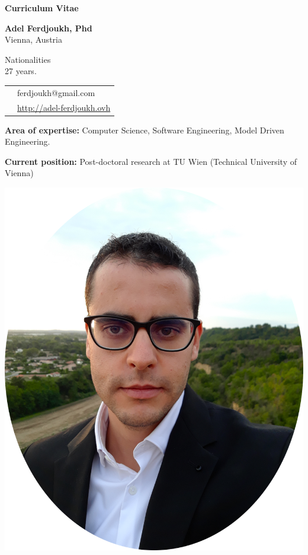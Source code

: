 \thispagestyle{empty}

\renewcommand\refname{~}

\begin{center}
\par\textbf{\huge Curriculum Vitae}
\end{center}

\vspace{.5cm}

\begin{minipage}{0.45\textwidth}
\textbf{Adel Ferdjoukh, Phd} \\
Vienna, Austria

\vspace{.3cm}

Nationalities \fr{} \dz{} \kab{} \\
27 years.

\vspace{.3cm}

\begin{tabular}{cl}
\email{} & ferdjoukh@gmail.com\\

\web{} & \url{http://adel-ferdjoukh.ovh}\\
\end{tabular}

\vspace{.3cm}
{\bf Area of expertise:} Computer Science, Software Engineering, Model Driven Engineering. 

\medskip
{\bf Current position:} Post-doctoral research at TU Wien (Technical University of Vienna)
\end{minipage}
\hfill
\begin{minipage}{0.45\textwidth}
\begin{flushright}
\includegraphics[scale=0.15]{img/me3.png}~~~~~~~~
\end{flushright}
\end{minipage}

\tair

\sectionline{}